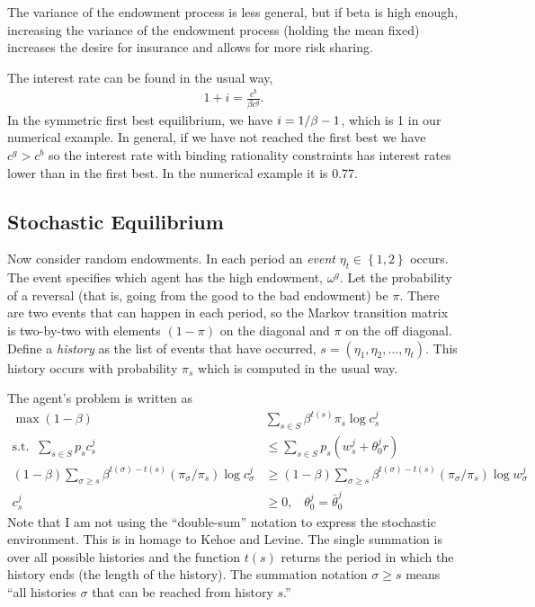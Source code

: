 \documentclass[11pt, pdftex]{article}
\begin{document}
The variance of the endowment process is less general, but if beta is high enough, increasing the variance of the endowment process (holding the mean fixed) increases the desire for insurance and allows for more risk sharing.

The interest rate can be found in the usual way,
\begin{align}\label{}
 1 + i = \frac{{{c^b}}}{{\beta {c^g}}}.
\end{align}
In the symmetric first best equilibrium, we have $i = {1 \mathord{\left/
 {\vphantom {1 \beta }} \right.
 \kern-\nulldelimiterspace} \beta } - 1$, which is 1 in our numerical example.  In general, if we have not reached the first best we have ${c^g} > {c^b}$ so the interest rate with binding rationality constraints has interest rates lower than in the first best.  In the numerical example it is 0.77.


\subsection*{Stochastic Equilibrium}
Now consider random endowments.  In each period an \textit{event} ${\eta _t} \in \left\{ {1,2} \right\}$ occurs.  The event specifies which agent has the high endowment, ${\omega ^g}$.  Let the probability of a reversal (that is, going from the good to the bad endowment) be $\pi $.  There are two events that can happen in each period, so the Markov transition matrix is two-by-two with elements $\left( {1 - \pi } \right)$ on the diagonal and $\pi $ on the off diagonal.  Define a \textit{history} as the list of events that have occurred, $s = \left( {{\eta _1},{\eta _2},...,{\eta _t}} \right)$.  This history occurs with probability ${\pi _s}$ which is computed in the usual way.

The agent's problem is written as
\begin{align}\label{}
  \max (1 - \beta )&\sum_{s \in S} {{\beta ^{t(s)}}\pi_s \log c_s^j}\\
 \mathrm{s.t.}\;\; \sum_{s \in S} {{p_s}c_s^j} &  \leq \sum_{s \in S} {{p_s}(w_s^j + \theta _0^jr)}\\
 \left(1 - \beta\right)\sum_{\sigma \geq s}\beta ^{t(\sigma ) - t(s)} \left(\pi_\sigma /\pi _s\right) \log c_\sigma^j  &\geq \left( 1 - \beta\right)\sum_{\sigma \geq s} {{\beta ^{t(\sigma ) - t(s)}}\left(\pi_\sigma/\pi _s\right) \log w_\sigma^j}\\
 c_s^j & \geq 0, \;\;\;\theta _0^j = \bar \theta _0^j
\end{align}
Note that I am not using the ``double-sum'' notation to express the stochastic environment.  This is in homage to Kehoe and Levine. The single summation is over all possible histories and the function $t(s)$ returns the period in which the history ends (the length of the history). The summation notation $\sigma \geq s$ means ``all histories $\sigma$ that can be reached from history $s$.''
\end{document}
